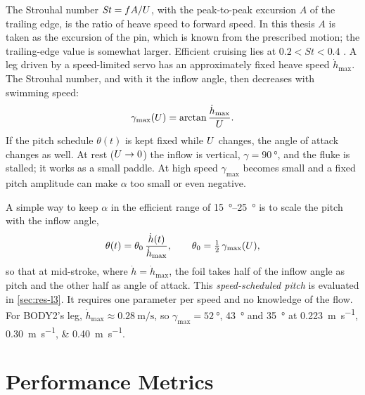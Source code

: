 The Strouhal number $\mathit{St}=fA/U$, with the peak-to-peak excursion $A$ of the trailing edge, is the ratio of heave speed to forward speed. In this thesis $A$ is taken as the excursion of the pin, which is known from the prescribed motion; the trailing-edge value is somewhat larger. Efficient cruising lies at $0.2<\mathit{St}<0.4$
\cite{Taylor2003,Triantafyllou1991}. A leg driven by a speed-limited servo has an approximately fixed heave
speed $\dot h_\text{max}$. The Strouhal number, and with it the inflow angle, then decreases with swimming speed:
\begin{equation}
  \gamma_\text{max}(U) = \arctan\frac{\dot h_\text{max}}{U}.
  \label{eq:gammamax}
\end{equation}
If the pitch schedule $\theta(t)$ is kept fixed while $U$ changes, the angle of attack changes as well. At rest
($U\to0$) the inflow is vertical, $\gamma=\SI{90}{\degree}$, and the fluke is stalled; it works as a small
paddle. At high speed $\gamma_\text{max}$ becomes small and a fixed pitch amplitude can make $\alpha$ too small
or even negative.

A simple way to keep $\alpha$ in the efficient range of \SIrange{15}{25}{\degree} \cite{Read2003,Hover2004} is to
scale the pitch with the inflow angle,
\begin{equation}
  \theta(t) = \theta_0\,\frac{\dot h(t)}{\dot h_\text{max}}, \qquad \theta_0=\tfrac12\,\gamma_\text{max}(U),
  \label{eq:l3}
\end{equation}
so that at mid-stroke, where $\dot h=\dot h_\text{max}$, the foil takes half of the inflow angle as pitch and
the other half as angle of attack. This \emph{speed-scheduled pitch} is evaluated in
\cref{sec:res-l3}. It requires one parameter per speed and no knowledge of the flow. For BODY2's leg,
$\dot h_\text{max}\approx\SI{0.28}{\metre\per\second}$, so $\gamma_\text{max}=\SI{52}{\degree}$,
\SI{43}{\degree} and \SI{35}{\degree} at \SIlist{0.223;0.30;0.40}{\metre\per\second}.

\section{Performance Metrics}
\label{sec:fund-metrics}

